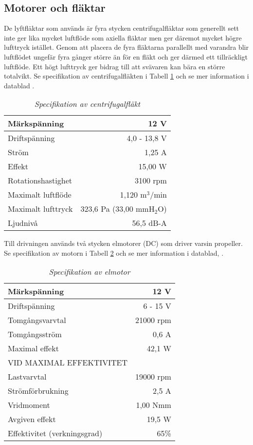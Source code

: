 \subsection{Motorer och fläktar}
De lyftfläktar som används är fyra stycken centrifugalfläktar som generellt sett
inte ger lika mycket luftflöde som axiella fläktar men ger däremot mycket högre
lufttryck istället. Genom att placera de fyra fläktarna parallellt med varandra
blir luftflödet ungefär fyra gånger större än för en fläkt och ger därmed ett
tillräckligt luftflöde. Ett högt lufttryck ger bidrag till att svävaren kan bära
en större totalvikt. Se specifikation av centrifugalfläkten i Tabell
\ref{tbl:fan_spec} och se mer information i datablad \cite{Delta_BFB1212VH-R00}
.

\begin{table}[htbp!]
\centering
\caption{\it Specifikation av centrifugalfläkt}
\label{tbl:fan_spec}
\begin{tabular}{|l|r|}
\hline
Märkspänning & 12 V\\
\hline
Driftspänning & 4,0 - 13,8 V\\
\hline
Ström & 1,25 A\\
\hline
Effekt & 15,00 W\\
\hline
Rotationshastighet & 3100 rpm\\
\hline
Maximalt luftflöde & 1,120 m$^3$/min\\
\hline
Maximalt lufttryck & 323,6 Pa (33,00 mmH$_2$O)\\
\hline
Ljudnivå & 56,5 dB-A\\
\hline
\end{tabular}
\end{table}

Till drivningen används två stycken elmotorer (DC) som driver varsin propeller.
Se specifikation av motorn i Tabell \ref{tbl:motor_spec} och se mer information
i datablad, \cite{Motraxx_XFLY400-12}.

\begin{table}[htbp!]
\centering
\caption{\it Specifikation av elmotor}
\label{tbl:motor_spec}
\begin{tabular}{|l|r|}
\hline
Märkspänning & 12 V\\
\hline
Driftspänning & 6 - 15 V\\
\hline
Tomgångsvarvtal & 21000 rpm\\
\hline
Tomgångsström & 0,6 A\\
\hline
Maximal effekt & 42,1 W\\
\hline
VID MAXIMAL EFFEKTIVITET &\\
\hline
Lastvarvtal & 19000 rpm\\
\hline
Strömförbrukning & 2,5 A\\
\hline
Vridmoment & 1,00 Nmm\\
\hline
Avgiven effekt & 19,5 W\\
\hline
Effektivitet (verkningsgrad) & 65\%\\
\hline
\end{tabular}	
\end{table}